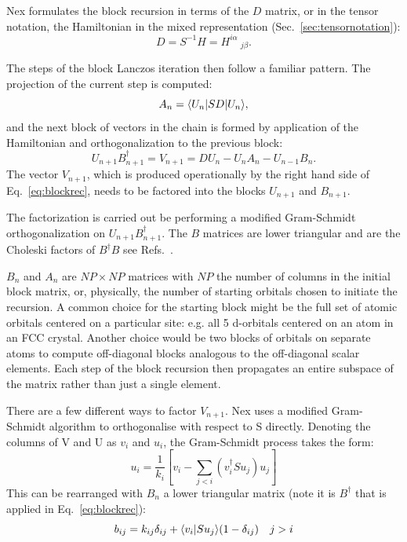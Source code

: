 Nex formulates the block recursion in terms of the 
$D$ matrix, or in the tensor notation, the 
Hamiltonian in the mixed representation 
(Sec.~\ref{sec:tensornotation}):
%
\begin{equation}
D = S^{-1}H = H^{i\alpha}\ _{j\beta}.
\end{equation}
%

The steps of the block Lanczos iteration then follow a familiar pattern.
The projection of the current step is computed:
%
\begin{equation}
A_{n} = \langle U_{n}|SD|U_{n}\rangle,
\end{equation}
%
and the next block of vectors in the chain is formed 
by application of the Hamiltonian and orthogonalization
to the previous block:
%
\begin{equation}
\label{eq:blockrec}
U_{n+1}B^{\dagger}_{n+1} = V_{n+1} = DU_{n} - U_{n}A_{n} - U_{n-1}B_{n}.
\end{equation}
%
The vector $V_{n+1}$, which is produced operationally by the right hand
side of Eq.~\ref{eq:blockrec}, needs to be factored into the blocks
$U_{n+1}$ and $B_{n+1}$. 

The factorization is carried out be performing a modified Gram-Schmidt
orthogonalization on  $U_{n+1}B_{n+1}^{\dagger}$. The $B$ matrices are
lower triangular and are the Choleski factors of $B^{\dagger}B$
see Refs.~\cite{nex89,godin91}.

$B_{n}$ and $A_{n}$ are $NP\times NP$ 
matrices with $NP$ the number of columns in the initial block matrix, 
or, physically, the number of starting orbitals chosen to
initiate the recursion. A common choice for the starting block
might be the full set of atomic orbitals centered on a particular 
site: e.g. all 5 d-orbitals centered on an atom in an FCC crystal. Another
choice would be two blocks of orbitals on separate atoms to compute
off-diagonal blocks analogous to the off-diagonal scalar elements.
Each step of the block recursion then propagates an entire 
subspace of the matrix rather than just a single element.

There are a few different ways to factor $V_{n+1}$. Nex
uses a modified Gram-Schmidt algorithm to orthogonalise 
with respect to S directly. Denoting the columns of V and U
as $v_{i}$ and $u_{i}$, the Gram-Schmidt process takes the
form:
%
\begin{equation}
u_{i} = \frac{1}{k_{i}}[v_{i} - \sum_{j < i}(v^{\dagger}_{i}Su_{j})u_{j}]
\end{equation}
%
This can be rearranged with $B_{n}$ a lower triangular 
matrix (note it is $B^{\dagger}$ that is applied 
in Eq.~\ref{eq:blockrec}):
%
\begin{equation}
b_{ij} = k_{ij}\delta_{ij} + \langle v_{i}|Su_{j}\rangle (1-\delta_{ij}) \quad j>i
\end{equation}

